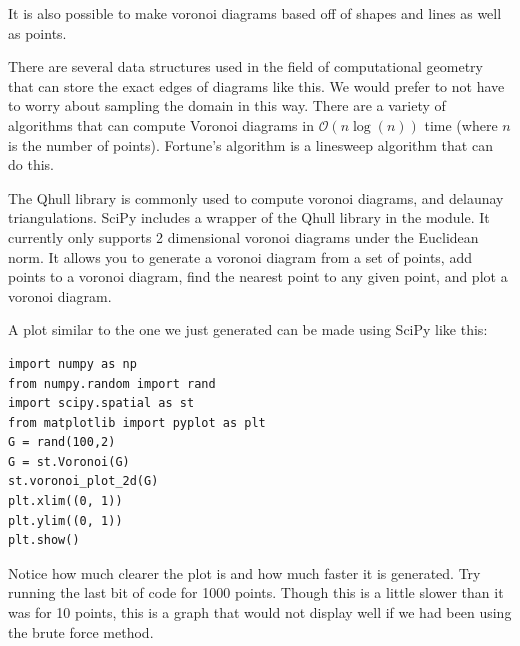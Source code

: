 It is also possible to make voronoi diagrams based off of shapes and lines as well as points. 

There are several data structures used in the field of computational geometry that can store the exact edges of diagrams like this.
We would prefer to not have to worry about sampling the domain in this way.
There are a variety of algorithms that can compute Voronoi diagrams in $\mathcal{O}\left( n \log\left(n\right)\right)$ time (where $n$ is the number of points).
Fortune's algorithm is a linesweep algorithm that can do this.

The Qhull library is commonly used to compute voronoi diagrams, and delaunay triangulations.
SciPy includes a wrapper of the Qhull library in the  module.
It currently only supports 2 dimensional voronoi diagrams under the Euclidean norm.
It allows you to generate a voronoi diagram from a set of points, add points to a voronoi diagram, find the nearest point to any given point, and plot a voronoi diagram.

A plot similar to the one we just generated can be made using SciPy like this:
\begin{lstlisting}
import numpy as np
from numpy.random import rand
import scipy.spatial as st
from matplotlib import pyplot as plt
G = rand(100,2)
G = st.Voronoi(G)
st.voronoi_plot_2d(G)
plt.xlim((0, 1))
plt.ylim((0, 1))
plt.show()
\end{lstlisting}
Notice how much clearer the plot is and how much faster it is generated.
Try running the last bit of code for 1000 points.
Though this is a little slower than it was for 10 points, this is a graph that would not display well if we had been using the brute force method.

